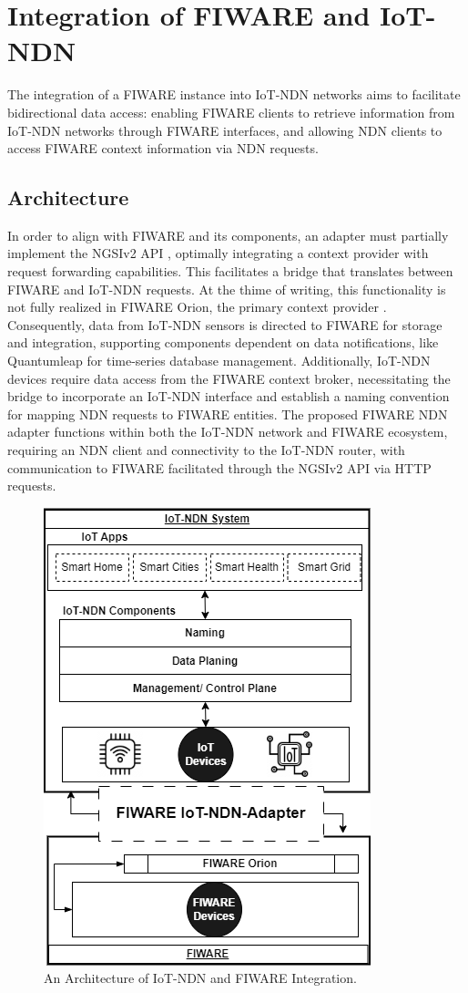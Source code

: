 \documentclass[conference]{IEEEtran}
\begin{document}
\section{Integration of FIWARE and IoT-NDN}
The integration of a FIWARE instance into IoT-NDN networks aims to facilitate bidirectional data access:
enabling FIWARE clients to retrieve information from IoT-NDN networks through FIWARE interfaces, and allowing NDN clients to access FIWARE context information via NDN requests.

\subsection{Architecture}
In order to align with FIWARE and its components, an adapter must partially implement the NGSIv2 API \cite[FIWARE developers]{b3}, optimally integrating a context provider with request forwarding capabilities.
This facilitates a bridge that translates between FIWARE and IoT-NDN requests.
At the thime of writing, this functionality is not fully realized in FIWARE Orion, the primary context provider \cite[FIWARE Orion]{b4}.
Consequently, data from IoT-NDN sensors is directed to FIWARE for storage and integration, supporting components dependent on data notifications, like Quantumleap for time-series database management.
Additionally, IoT-NDN devices require data access from the FIWARE context broker, necessitating the bridge to incorporate an IoT-NDN interface and establish a naming convention for mapping NDN requests to FIWARE entities.
The proposed FIWARE NDN adapter functions within both the IoT-NDN network and FIWARE ecosystem, requiring an NDN client and connectivity to the IoT-NDN router, with communication to FIWARE facilitated through the NGSIv2 API via HTTP requests.

\begin{figure}[htbp]
    \centerline{\includegraphics[scale=.4]{graph_draft.png}}
    \caption{ An Architecture of IoT-NDN and FIWARE Integration.}
    \label{iot-ndn-fiware}
\end{figure}
\end{document}

